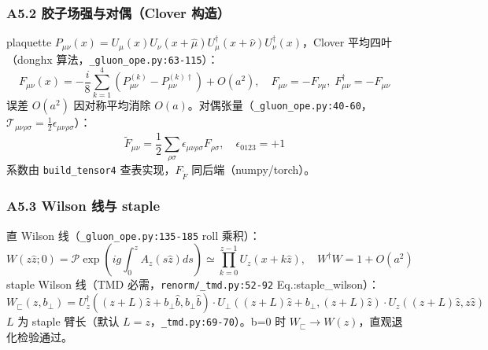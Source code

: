 \documentclass[UTF8]{ctexart}
\begin{document}
\subsubsection{A5.2 胶子场强与对偶（Clover 构造）}
plaquette $P_{\mu\nu}(x)=U_\mu(x)U_\nu(x+\hat\mu)U^\dagger_\mu(x+\hat\nu)U^\dagger_\nu(x)$，Clover 平均四叶（donghx 算法，\texttt{\nolinkurl{\_gluon\_ope.py:63-115}}）：
\begin{equation}
F_{\mu\nu}(x)= -\frac{i}{8}\sum_{k=1}^4\left(P^{(k)}_{\mu\nu}-P^{(k)\dagger}_{\mu\nu}\right)+O(a^2),\quad F_{\mu\nu}=-F_{\nu\mu},\;F^\dagger_{\mu\nu}=-F_{\mu\nu}
\label{eq:clover}
\end{equation}
误差 $O(a^2)$ 因对称平均消除 $O(a)$。对偶张量（\texttt{\nolinkurl{\_gluon\_ope.py:40-60}}，$\mathcal{T}_{\mu\nu\rho\sigma}=\frac12\epsilon_{\mu\nu\rho\sigma}$）：
\begin{equation}
\tilde F_{\mu\nu}= \frac12\sum_{\rho\sigma}\epsilon_{\mu\nu\rho\sigma}F_{\rho\sigma},\quad \epsilon_{0123}=+1
\label{eq:dual}
\end{equation}
系数由 \texttt{\nolinkurl{build\_tensor4}} 查表实现，$F_{\tilde F}$ 同后端（numpy/torch）。

\subsubsection{A5.3 Wilson 线与 staple}
直 Wilson 线（\texttt{\nolinkurl{\_gluon\_ope.py:135-185}} roll 乘积）：
\begin{equation}
W(z\hat z;0)= \mathcal{P}\exp\left(ig\int_0^z A_z(s\hat z)ds\right)\simeq \prod_{k=0}^{z-1}U_z(x+k\hat z),\quad W^\dagger W=1+O(a^2)
\label{eq:Wline}
\end{equation}
staple Wilson 线（TMD 必需，\texttt{\nolinkurl{renorm/\_tmd.py:52-92}} Eq.:staple\_wilson）：
\begin{equation}
W_\sqsubset(z,b_\perp)=U^\dagger_z((z+L)\hat z+b_\perp\hat b,b_\perp\hat b)\cdot U_\perp((z+L)\hat z+b_\perp,(z+L)\hat z)\cdot U_z((z+L)\hat z,z\hat z)
\label{eq:stapleW}
\end{equation}
$L$ 为 staple 臂长（默认 $L=z$，\texttt{\nolinkurl{\_tmd.py:69-70}}）。b=0 时 $W_\sqsubset\to W(z)$，直观退化检验通过。
\end{document}
